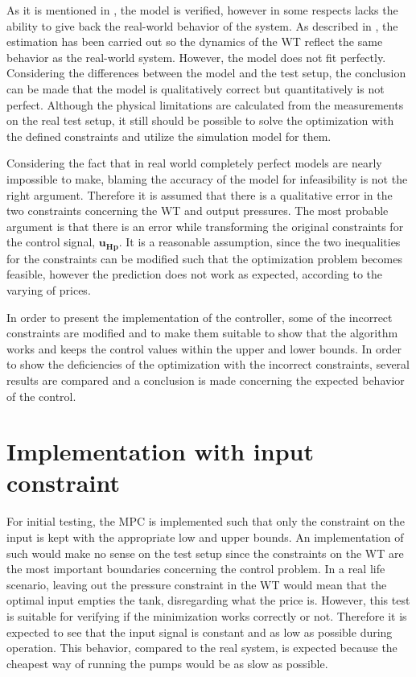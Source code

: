 As it is mentioned in , the model is verified, however in some respects lacks the ability to give back the real-world behavior of the system. As described in , the estimation has been carried out so the dynamics of the WT reflect the same behavior as the real-world system. However, the model does not fit perfectly. Considering the differences between the model and the test setup, the conclusion can be made that the model is qualitatively correct but quantitatively is not perfect. Although the physical limitations are calculated from the measurements on the real test setup, it still should be possible to solve the optimization with the defined constraints and utilize the simulation model for them.

 Considering the fact that in real world completely perfect models are nearly impossible to make, blaming the accuracy of the model for infeasibility is not the right argument. Therefore it is assumed that there is a qualitative error in the two constraints concerning the WT and output pressures. The most probable argument is that there is an error while transforming the original constraints for the control signal, $\bm{u_{Hp}}$. It is a reasonable assumption, since the two inequalities for the constraints can be modified such that the optimization problem becomes feasible, however the prediction does not work as expected, according to the varying of prices. 

In order to present the implementation of the controller, some of the incorrect constraints are modified and to make them suitable to show that the algorithm works and keeps the control values within the upper and lower bounds. In order to show the deficiencies of the optimization with the incorrect constraints, several results are compared and a conclusion is made concerning the expected behavior of the control. 

\section{Implementation with input constraint}
\label{input constraint}

For initial testing, the MPC is implemented such that only the constraint on the input is kept with the appropriate low and upper bounds. An implementation of such would make no sense on the test setup since the constraints on the WT are the most important boundaries concerning the control problem. In a real life scenario, leaving out the pressure constraint in the WT would mean that the optimal input empties the tank, disregarding what the price is. However, this test is suitable for verifying if the minimization works correctly or not. Therefore it is expected to see that the input signal is constant and as low as possible during operation. This behavior, compared to the real system, is expected because the cheapest way of running the pumps would be as slow as possible. 


